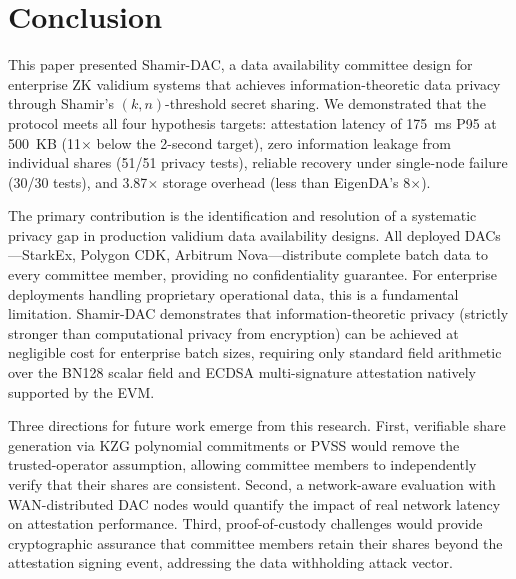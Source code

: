 
\section{Conclusion}

This paper presented Shamir-DAC, a data availability committee design for
enterprise ZK validium systems that achieves information-theoretic data
privacy through Shamir's $(k,n)$-threshold secret sharing. We demonstrated
that the protocol meets all four hypothesis targets: attestation latency
of 175~ms P95 at 500~KB (11$\times$ below the 2-second target), zero
information leakage from individual shares (51/51 privacy tests), reliable
recovery under single-node failure (30/30 tests), and 3.87$\times$ storage
overhead (less than EigenDA's 8$\times$).

The primary contribution is the identification and resolution of a systematic
privacy gap in production validium data availability designs. All deployed
DACs---StarkEx, Polygon CDK, Arbitrum Nova---distribute complete batch data to
every committee member, providing no confidentiality guarantee. For enterprise
deployments handling proprietary operational data, this is a fundamental
limitation. Shamir-DAC demonstrates that information-theoretic privacy
(strictly stronger than computational privacy from encryption) can be
achieved at negligible cost for enterprise batch sizes, requiring only
standard field arithmetic over the BN128 scalar field and ECDSA multi-signature
attestation natively supported by the EVM.

Three directions for future work emerge from this research. First, verifiable
share generation via KZG polynomial commitments or PVSS would remove the
trusted-operator assumption, allowing committee members to independently
verify that their shares are consistent. Second, a network-aware evaluation
with WAN-distributed DAC nodes would quantify the impact of real network
latency on attestation performance. Third, proof-of-custody challenges would
provide cryptographic assurance that committee members retain their shares
beyond the attestation signing event, addressing the data withholding attack
vector.
